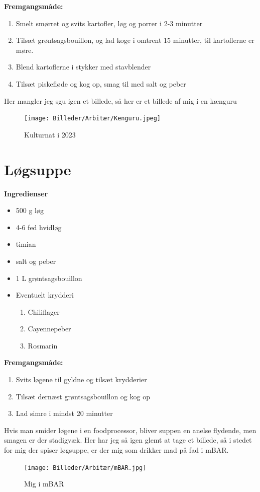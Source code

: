 \documentclass{book}
\begin{document}
\begin{minipage}[t]{0.5\textwidth}
\textbf{Fremgangsmåde:}
\begin{enumerate}
    \item Smelt smørret og svits kartofler, løg og porrer i 2-3 minutter
    \item Tilsæt grøntsagsbouillon, og lad koge i omtrent 15 minutter, til kartoflerne er møre.
    \item Blend kartoflerne i stykker med stavblender
    \item Tilsæt piskefløde og kog op, smag til med salt og peber
\end{enumerate}
\end{minipage}
\newpage Her mangler jeg sgu igen et billede, så her er et billede af mig i en kænguru 
\begin{figure}
    \centering
    \texttt{[image: Billeder/Arbitær/Kenguru.jpeg]}
    \caption{Kulturnat i 2023}
    
\end{figure}
\newpage \section{Løgsuppe}
\begin{minipage}[t]{0.5\textwidth}
\textbf{Ingredienser}
\begin{itemize}
    \item 500 g løg 
    \item 4-6 fed hvidløg
    \item timian
    \item salt og peber
    \item 1 L grøntsagsbouillon
    \item Eventuelt krydderi
    \begin{enumerate}
        \item Chiliflager
        \item Cayennepeber
        \item Rosmarin
    \end{enumerate}
\end{itemize}
\end{minipage}
\begin{minipage}[t]{0.5\textwidth}
\textbf{Fremgangsmåde:}
\begin{enumerate}
    \item Svits løgene til gyldne og tilsæt krydderier
    \item Tilsæt dernæst grøntsagsbouillon og kog op
    \item Lad simre i mindst 20 minutter
\end{enumerate}
\end{minipage}
Hvis man smider løgene i en foodprocessor, bliver suppen en anelse flydende, men smagen er der stadigvæk.
\newpage 
Her har jeg så igen glemt at tage et billede, så i stedet for mig der spiser løgsuppe, er der mig som drikker mad på fad i mBAR.
\begin{figure}
    \centering
    \texttt{[image: Billeder/Arbitær/mBAR.jpg]}
    \caption{Mig i mBAR}
    
\end{figure}
\newpage 
\end{document}
